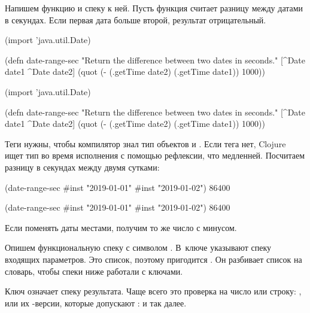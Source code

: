 
Напишем функцию и спеку к ней. Пусть функция считает разницу между датами в
секундах. Если первая дата больше второй, результат отрицательный.

\ifnarrow


\begin{clojure}
(import 'java.util.Date)

(defn date-range-sec
  "Return the difference
           between two dates in seconds."
  [^Date date1 ^Date date2]
  (quot (- (.getTime date2)
           (.getTime date1))
        1000))
\end{clojure}


\else


\begin{clojure}
(import 'java.util.Date)

(defn date-range-sec
  "Return the difference between two dates in seconds."
  [^Date date1 ^Date date2]
  (quot (- (.getTime date2)
           (.getTime date1))
        1000))
\end{clojure}


\fi

Теги  нужны, чтобы компилятор знал тип объектов  и
. Если тега нет, Clojure ищет тип во время исполнения с помощью
рефлексии, что медленней. Посчитаем разницу в секундах между двумя сутками:

\ifnarrow


\begin{clojure}
(date-range-sec #inst "2019-01-01"
                #inst "2019-01-02")
86400
\end{clojure}


\else


\begin{clojure}
(date-range-sec #inst "2019-01-01" #inst "2019-01-02")
86400
\end{clojure}


\fi

\noindent
Если поменять даты местами, получим то же число с минусом.

Опишем функциональную спеку с символом . В~ключе
 указывают спеку входящих параметров. Это список, поэтому пригодится
. Он разбивает список на словарь, чтобы спеки ниже работали с
ключами.

Ключ  означает спеку результата. Чаще всего это проверка на число или
строку: ,  или их -версии, которые
допускают :  и так далее.

